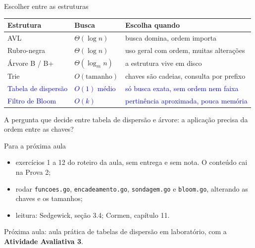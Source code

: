 \documentclass{beamer}
\newcommand{\tcb}[1]{\textcolor{blue}{#1}}
\begin{document}
\begin{frame}{Escolher entre as estruturas}
	\begin{center}
		\scriptsize
		\begin{tabular}{ll>{\raggedright\arraybackslash}p{4.6cm}}
			\toprule
			\textbf{Estrutura}           & \textbf{Busca}       & \textbf{Escolha quando}                   \\
			\midrule
			AVL                          & $\Theta(\log n)$     & busca domina, ordem importa               \\
			Rubro-negra                  & $\Theta(\log n)$     & uso geral com ordem, muitas alterações    \\
			Árvore B / B+                & $\Theta(\log_m n)$   & a estrutura vive em disco                 \\
			Trie                         & $O(\text{tamanho})$  & chaves são cadeias, consulta por prefixo  \\
			\tcb{Tabela de dispersão}    & \tcb{$O(1)$ médio}   & \tcb{só busca exata, sem ordem nem faixa} \\
			\tcb{Filtro de Bloom}        & \tcb{$O(k)$}         & \tcb{pertinência aproximada, pouca memória} \\
			\bottomrule
		\end{tabular}
	\end{center}

	\vspace{0.4cm}
	A pergunta que decide entre tabela de dispersão e árvore: a aplicação precisa
	da ordem entre as chaves?
\end{frame}

\begin{frame}{Para a próxima aula}
	\begin{itemize}
		\item exercícios 1 a 12 do roteiro da aula, sem entrega e sem nota. O
		      conteúdo cai na Prova 2;
		\item rodar \texttt{funcoes.go}, \texttt{encadeamento.go},
		      \texttt{sondagem.go} e \texttt{bloom.go}, alterando as chaves e os
		      tamanhos;
		\item leitura: Sedgewick, seção 3.4; Cormen, capítulo 11.
	\end{itemize}

	\vspace{0.5cm}
	Próxima aula: aula prática de tabelas de dispersão em laboratório, com a
	\textbf{Atividade Avaliativa 3}.
\end{frame}
\end{document}

